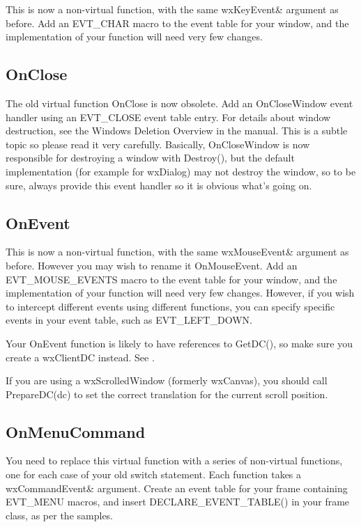 This is now a non-virtual function, with the same wxKeyEvent\& argument as before.
Add an EVT\_CHAR macro to the event table
for your window, and the implementation of your function will need very few changes.

\subsection{OnClose}

The old virtual function OnClose is now obsolete.
Add an OnCloseWindow event handler using an EVT\_CLOSE event table entry. For details
about window destruction, see the Windows Deletion Overview in the manual. This is a subtle
topic so please read it very carefully. Basically, OnCloseWindow is now responsible for
destroying a window with Destroy(), but the default implementation (for example for wxDialog) may not
destroy the window, so to be sure, always provide this event handler so it is obvious what's going on.

\subsection{OnEvent}

This is now a non-virtual function, with the same wxMouseEvent\& argument as before. However
you may wish to rename it OnMouseEvent. Add an EVT\_MOUSE\_EVENTS macro to the event table
for your window, and the implementation of your function will need very few changes.
However, if you wish to intercept different events using different functions, you can
specify specific events in your event table, such as EVT\_LEFT\_DOWN.

Your OnEvent function is likely to have references to GetDC(), so make sure you create
a wxClientDC instead. See .

If you are using a wxScrolledWindow (formerly wxCanvas), you should call
PrepareDC(dc) to set the correct translation for the current scroll position.

\subsection{OnMenuCommand}

You need to replace this virtual function with a series of non-virtual functions, one for
each case of your old switch statement. Each function takes a wxCommandEvent\& argument.
Create an event table for your frame
containing EVT\_MENU macros, and insert DECLARE\_EVENT\_TABLE() in your frame class, as
per the samples.

